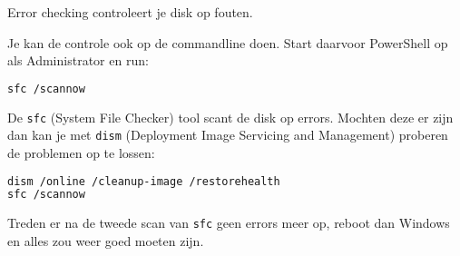 Error checking controleert je disk op fouten.

Je kan de controle ook op de commandline doen. Start daarvoor PowerShell op als Administrator en run:
\begin{lstlisting}[language=bash]
sfc /scannow
\end{lstlisting}
De \texttt{sfc} (System File Checker) tool scant de disk op errors. Mochten deze er zijn dan kan je met \texttt{dism} (Deployment Image Servicing and Management) proberen de problemen op te lossen:
\begin{lstlisting}[language=bash]
dism /online /cleanup-image /restorehealth
sfc /scannow
\end{lstlisting}

Treden er na de tweede scan van \texttt{sfc} geen errors meer op, reboot dan Windows en alles zou weer goed moeten zijn.

